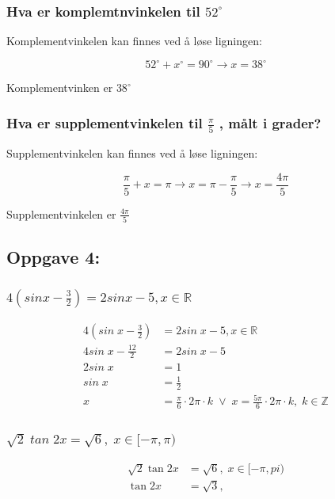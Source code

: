 \documentclass{article}
\begin{document}
\subsubsection{Hva er komplemtnvinkelen til $52^{\circ}$}

Komplementvinkelen kan finnes ved å løse ligningen:

$$52^{\circ}+x^{\circ}=90^{\circ} \rightarrow x=38^{\circ}$$

Komplementvinken er $38^{\circ}$

\subsubsection{Hva er supplementvinkelen til $\frac{\pi}{5}$ , målt i grader?}

Supplementvinkelen kan finnes ved å løse ligningen:

$$\frac{\pi}{5} + x = \pi \rightarrow x = \pi - \frac{\pi}{5} \rightarrow x = \frac{4\pi}{5}$$

Supplementvinkelen er $\frac{4\pi}{5}$

\subsection{Oppgave 4: }

\subsubsection{$4(sinx-\frac{3}{2}) = 2sinx-5, x \in \mathbb{R}$}

\begin{align*}
    4(sin\;x-\frac{3}{2}) &= 2sin\;x-5, x \in \mathbb{R} \\
    4sin\;x - \frac{12}{2} &= 2sin\;x-5 \\
    2sin\;x &= 1 \\
    sin \;x &= \frac{1}{2} \\
    x &= \frac{\pi}{6} \cdot 2\pi \cdot k \;\lor\; x = \frac{5 \pi}{6} \cdot 2 \pi \cdot k , \; k \in \mathbb{Z}
\end{align*}

\subsubsection{$\sqrt{2} \; tan \; 2x = \sqrt{6}, \; x \in [-\pi, \pi)$}

\begin{align*}
    \sqrt{2} \tan 2x &= \sqrt{6}, \; x \in [-\pi, pi) \\
    \tan 2x &= \sqrt3, \;
\end{align*}
\end{document}
